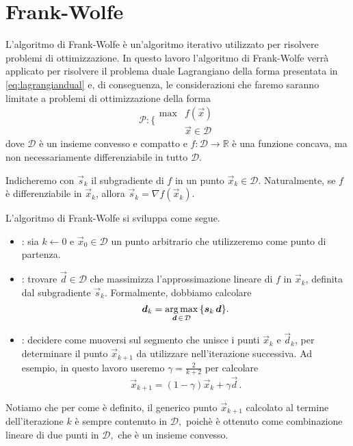 \section{Frank-Wolfe}\label{sec:fw}
L'algoritmo di Frank-Wolfe è un'algoritmo iterativo utilizzato per risolvere problemi di ottimizzazione. In questo
lavoro l'algoritmo di Frank-Wolfe verrà applicato per risolvere il problema duale Lagrangiano della forma presentata in
\eqref{eq:lagrangiandual} e, di conseguenza, le considerazioni che faremo saranno limitate a problemi di ottimizzazione
della forma
\begin{equation}
    \mathcal{P}\colon \bigg\{
    \begin{array}{ll}
        \max & f(\vec{x}) \\
             & \vec{x} \in \mathcal{D}
    \end{array}
\end{equation}
dove \( \mathcal{D} \) è un insieme convesso e compatto e \( f\colon \mathcal{D} \to \mathbb{R} \) è una funzione
concava, ma non necessariamente differenziabile in tutto \( \mathcal{D} \).

Indicheremo con \( \vec{s}_k \) il subgradiente di \( f \) in un punto \( \vec{x}_k \in \mathcal{D} \). Naturalmente, se
\( f \) è differenziabile in \( \vec{x}_k \), allora \( \vec{s}_k = \nabla f(\vec{x}_k) \).

L'algoritmo di Frank-Wolfe si sviluppa come segue.

\begin{itemize}
    \item {}: sia \( k \gets 0 \) e \( \vec{x}_0 \in \mathcal{D} \) un punto arbitrario che
        utilizzeremo come punto di partenza.

    \item {}: trovare \( \vec{d} \in \mathcal{D} \) che massimizza l'approssimazione lineare di \( f
        \) in \( \vec{x}_k \), definita dal subgradiente \( \vec{s}_k \). Formalmente,
        dobbiamo calcolare
        \[
            \bm{d}_k = \operatorname*{arg\,max}_{\bm{d} \,\in\, \mathcal{D}} \, \{\bm{s}_k\, \bm{d}\}.
        \]
    \item {}: decidere come muoversi sul segmento che unisce i punti \(
        \vec{x}_k \) e \( \vec{d}_k \), per determinare il punto \( \vec{x}_{k+1} \) da utilizzare nell'iterazione
        successiva. Ad esempio, in questo lavoro useremo \( \gamma = \frac{2}{k+2} \) per calcolare
        \[
            \vec{x}_{k+1} = (1 - \gamma)\vec{x}_k + \gamma\vec{d}\,.
        \]
\end{itemize}
Notiamo che per come è definito, il generico punto \( \vec{x}_{k+1} \) calcolato al termine dell'iterazione \( k \) è
sempre contenuto in
\(
    \mathcal{D},
\)
poichè è ottenuto come combinazione lineare di due punti in
\(
    \mathcal{D},
\)
che è un insieme convesso.

